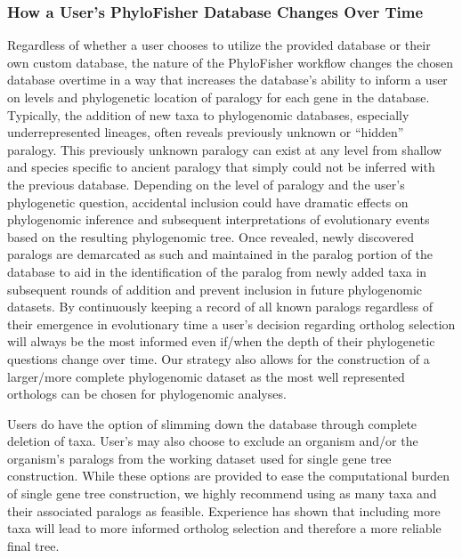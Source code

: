 \documentclass{article}
\begin{document}
        \subsubsection{How a User’s PhyloFisher Database Changes Over Time}
        Regardless of whether a user chooses to utilize the provided database or their own custom database, the nature of the PhyloFisher workflow changes the chosen database overtime in a way that increases the database’s ability to inform a user on levels and phylogenetic location of paralogy for each gene in the database. Typically, the addition of new taxa to phylogenomic databases, especially underrepresented lineages, often reveals previously unknown or “hidden” paralogy. This previously unknown paralogy can exist at any level from shallow and species specific to ancient paralogy that simply could not be inferred with the previous database. Depending on the level of paralogy and the user’s phylogenetic question, accidental inclusion could have dramatic effects on phylogenomic inference and subsequent interpretations of evolutionary events based on the resulting phylogenomic tree. Once revealed, newly discovered paralogs are demarcated as such and maintained in the paralog portion of the database to aid in the identification of the paralog from newly added taxa in subsequent rounds of addition and prevent inclusion in future phylogenomic datasets. By continuously keeping a record of all known paralogs regardless of their emergence in evolutionary time a user’s decision regarding ortholog selection will always be the most informed even if/when the depth of their phylogenetic questions change over time. Our strategy also allows for the construction of a larger/more complete phylogenomic dataset as the most well represented orthologs can be chosen for phylogenomic analyses. 
                
         Users do have the option of slimming down the database through complete deletion of taxa. User’s may also choose to exclude an organism and/or the organism’s paralogs from the working dataset used for single gene tree construction. While these options are provided to ease the computational burden of single gene tree construction, we highly recommend using as many taxa and their associated paralogs as feasible. Experience has shown that including more taxa will lead to more informed ortholog selection and therefore a more reliable final tree.
                
\end{document}

